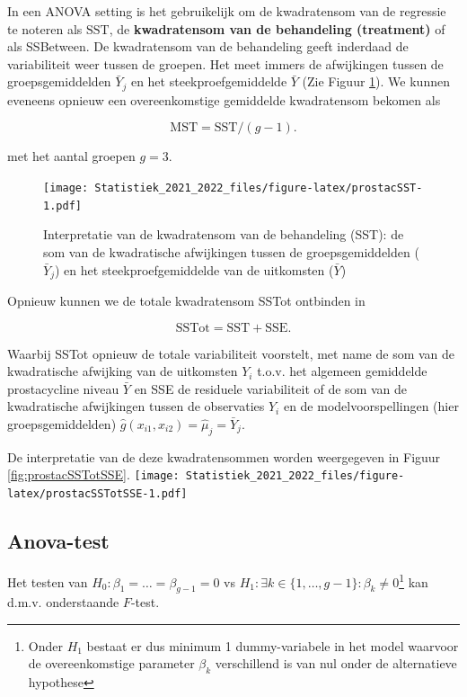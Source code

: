 \documentclass[
  12pt,dutch,coursenotes]{book}
\theoremstyle{definition}
\theoremstyle{definition}
\theoremstyle{definition}
\theoremstyle{definition}
\theoremstyle{remark}
\begin{document}
In een ANOVA setting is het gebruikelijk om de kwadratensom van de regressie te noteren als \(\text{SST}\), de \textbf{kwadratensom van de behandeling (treatment)} of als SSBetween.
De kwadratensom van de behandeling geeft inderdaad de variabiliteit weer tussen de groepen.
Het meet immers de afwijkingen tussen de groepsgemiddelden \(\bar Y_j\) en het steekproefgemiddelde \(\bar Y\) (Zie Figuur \ref{fig:prostacSST}).
We kunnen eveneens opnieuw een overeenkomstige gemiddelde kwadratensom bekomen als

\[\text{MST}=\text{SST}/(g-1).\]

met het aantal groepen \(g=3\).

\begin{figure}
\centering
\texttt{[image: Statistiek\_2021\_2022\_files/figure-latex/prostacSST-1.pdf]}
\caption{\label{fig:prostacSST}Interpretatie van de kwadratensom van de behandeling (SST): de som van de kwadratische afwijkingen tussen de groepsgemiddelden (\(\bar Y_j\)) en het steekproefgemiddelde van de uitkomsten (\(\bar Y\))}
\end{figure}

Opnieuw kunnen we de totale kwadratensom SSTot ontbinden in

\[\text{SSTot} = \text{SST} + \text{SSE}.\]

Waarbij SSTot opnieuw de totale variabiliteit voorstelt, met name de som van de kwadratische afwijking van de uitkomsten \(Y_{i}\) t.o.v. het algemeen gemiddelde prostacycline niveau \(\bar{Y}\) en SSE de residuele variabiliteit of de som van de kwadratische afwijkingen tussen de observaties \(Y_{i}\) en de modelvoorspellingen (hier groepsgemiddelden) \(\hat{g}(x_{i1},x_{i2})=\hat \mu_j=\bar Y_j\).

De interpretatie van de deze kwadratensommen worden weergegeven in Figuur \ref{fig:prostacSSTotSSE}.
\texttt{[image: Statistiek\_2021\_2022\_files/figure-latex/prostacSSTotSSE-1.pdf]}

\hypertarget{anova-test}{%
\subsection{Anova-test}\label{anova-test}}

Het testen van \(H_0: \beta_1=\ldots=\beta_{g-1}=0\) vs \(H_1: \exists k \in\{1,\ldots,g-1\} : \beta_k \neq0\)\footnote{Onder \(H_1\) bestaat er dus minimum 1 dummy-variabele in het model waarvoor de overeenkomstige parameter \(\beta_k\) verschillend is van nul onder de alternatieve hypothese} kan d.m.v. onderstaande \(F\)-test.
\end{document}
